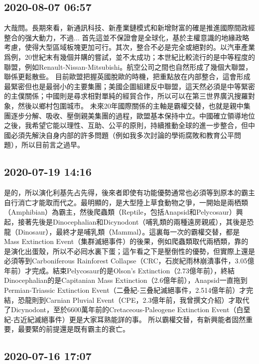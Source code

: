 \documentclass[twocolumn]{ctexart}
\begin{document}
\subsection*{2020-08-07 06:57}

大哉問。長期來看，新通訊科技、新產業鏈模式和新增財富的確是推進國際間政經整合的强大動力，不過...
首先這並不保證會是全球化，基於主權意識的地緣政略考慮，使得大型區域板塊更加可行。其次，整合不必是完全或絕對的。以汽車產業爲例，20世紀末有幾個并購的嘗試，並不太成功；本世紀比較流行的是中等程度的聯盟，例如Renault-Nissan-Mitsubishi。航空公司之間也自然形成了幾個大聯盟，聯係更鬆散些。
目前歐盟把握英國脫歐的時機，把重點放在内部整合，這會形成最緊密但也是最弱小的主要集團；美國企圖組建反中聯盟，這天然必須是中等緊密的主僕關係；中國則是尋求相對單純的經貿合作，所以可以在第三世界廣汎搜羅對象，然後以鄉村包圍城市。
未來20年國際關係的主軸是霸權交替，也就是親中集團逐步分解、吸收、壓倒親美集團的過程，歐盟基本保持中立。中國確立領導地位之後，我希望它能以理性、互助、公平的原則，持續推動全球的進一步整合，但中國必須先解決自身内部的許多問題（例如我多次討論的學術腐敗和教育公平問題），所以目前言之過早。
\subsection*{2020-07-19 14:16}

是的，所以演化利基先占先得，後來者即使有功能優勢通常也必須等到原本的霸主自行消亡才能取而代之。最明顯的，是大型陸上草食動物之爭，一開始是兩栖類（Amphibian）為霸主，然後爬蟲類（Reptile，包括Anapsid和Pelycosaur）興起，接著先後是Dinocephalian和Dicynodont（哺乳類的兩種遠房親戚），其後是恐龍（Dinosaur），最終才是哺乳類（Mammal）。這裏每一次的霸權交替，都是Mass Extinction Event（集群滅絕事件）的後果，例如爬蟲類取代兩栖類，靠的是演化出蛋殼，所以不必囘水裏下蛋；這乍看之下是壓倒性的優勢，但實際上還是必須等到Carboniferous Rainforest Collapse（CRC，石炭紀雨林崩潰事件，3.05億年前）才完成。結束Pelycosaur的是Olson's Extinction（2.73億年前），終結Dinocephalian的是Capitanian Mass Extinction（2.6億年前），Anapsid一直拖到Permian-Triassic Extinction Event（二叠紀-三叠紀滅絕事件，2.514億年前）才完結，恐龍則到Carnian Pluvial Event（CPE，2.3億年前，我曾撰文介紹）才取代了Dicynodont，至於6600萬年前的Cretaceous-Paleogene Extinction Event（白堊紀-古近紀滅絕事件）更是大家耳熟能詳的事。
所以霸權交替，有新興能者固然重要，最要緊的前提還是既有霸主的衰亡。
\subsection*{2020-07-16 17:07}
\end{document}
